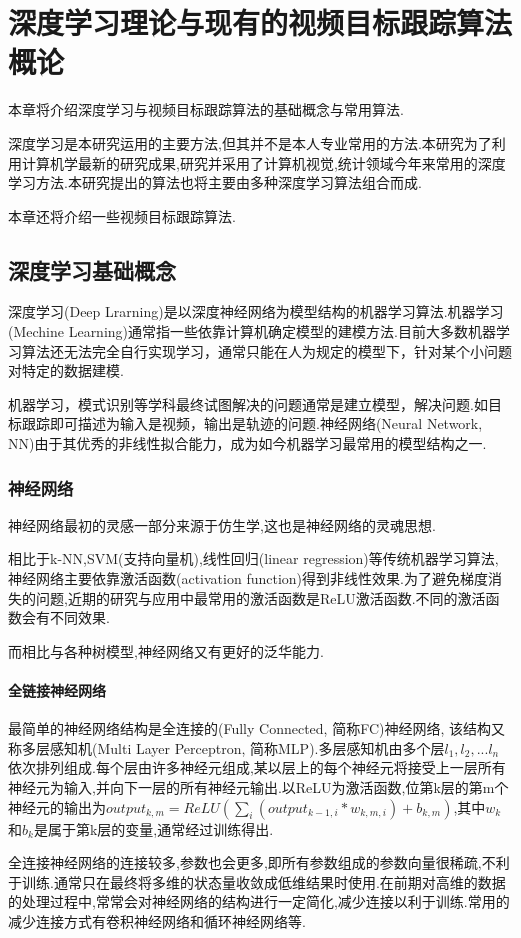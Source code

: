 
\chapter{深度学习理论与现有的视频目标跟踪算法概论}
本章将介绍深度学习与视频目标跟踪算法的基础概念与常用算法.
\par
深度学习是本研究运用的主要方法,但其并不是本人专业常用的方法.本研究为了利用计算机学最新的研究成果,研究并采用了计算机视觉,统计领域今年来常用的深度学习方法.本研究提出的算法也将主要由多种深度学习算法组合而成.
\par
本章还将介绍一些视频目标跟踪算法.
\section{深度学习基础概念}
深度学习(Deep Lrarning)是以深度神经网络为模型结构的机器学习算法\supercite{deng2014deep}.机器学习(Mechine Learning)通常指一些依靠计算机确定模型的建模方法.目前大多数机器学习算法还无法完全自行实现学习，通常只能在人为规定的模型下，针对某个小问题对特定的数据建模.
\par
机器学习，模式识别等学科最终试图解决的问题通常是建立模型，解决问题.如目标跟踪即可描述为输入是视频，输出是轨迹的问题.神经网络(Neural Network, NN)由于其优秀的非线性拟合能力，成为如今机器学习最常用的模型结构之一.
\subsection{神经网络}
神经网络最初的灵感一部分来源于仿生学\supercite{mcculloch1943logical}\supercite{farley1954simulation},这也是神经网络的灵魂思想.
\par
相比于k-NN,SVM(支持向量机),线性回归(linear regression)等传统机器学习算法,神经网络主要依靠激活函数(activation function)得到非线性效果.为了避免梯度消失的问题,近期的研究与应用中最常用的激活函数是ReLU激活函数\supercite{krizhevsky2012imagenet}.不同的激活函数会有不同效果\supercite{karlik2011performance}.
\par
而相比与各种树模型,神经网络又有更好的泛华能力.
\par
\subsubsection{全链接神经网络}
\par
最简单的神经网络结构是全连接的(Fully Connected, 简称FC)神经网络, 该结构又称多层感知机(Multi Layer Perceptron, 简称MLP).多层感知机由多个层$l_1,l_2,...l_n$依次排列组成.每个层由许多神经元组成,某以层上的每个神经元将接受上一层所有神经元为输入,并向下一层的所有神经元输出.以ReLU为激活函数,位第k层的第m个神经元的输出为$output_{k,m}=ReLU(\sum_{i} (output_{k-1,i}*w_{k,m,i})+b_{k,m})$,其中$w_{k}$和$b_{k}$是属于第k层的变量,通常经过训练得出.
\par
全连接神经网络的连接较多,参数也会更多,即所有参数组成的参数向量很稀疏,不利于训练.通常只在最终将多维的状态量收敛成低维结果时使用.在前期对高维的数据的处理过程中,常常会对神经网络的结构进行一定简化,减少连接以利于训练.常用的减少连接方式有卷积神经网络和循环神经网络等.
\par
